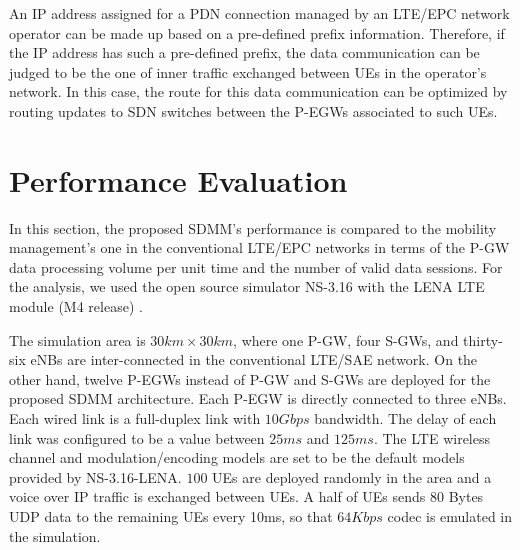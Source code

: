 \documentclass[runningheads,a4paper]{llncs}
\begin{document}
An IP address assigned for a PDN connection managed by an LTE/EPC network operator can be made up based on a pre-defined prefix information. Therefore, if the IP address has such a pre-defined prefix, the data communication can be judged to be the one of inner traffic exchanged between UEs in the operator's network. In this case, the route for this data communication can be optimized by routing updates to SDN switches between the P-EGWs associated to such UEs.


\section{Performance Evaluation}

In this section, the proposed SDMM's performance is compared to the mobility management's one in the conventional LTE/EPC networks in terms of the P-GW data processing volume per unit time and the number of valid data sessions. For the analysis, we used the open source simulator NS-3.16 with the LENA LTE module (M4 release) \cite{ref13-1}.

The simulation area is $30 km \times 30 km$, where one P-GW, four S-GWs, and thirty-six eNBs are inter-connected in the conventional LTE/SAE network. On the other hand, twelve P-EGWs instead of P-GW and S-GWs are deployed for the proposed SDMM architecture. Each P-EGW is directly connected to three eNBs. Each wired link is a full-duplex link with $10 Gbps$ bandwidth. The delay of each link was configured to be a value between $25 ms$ and $125 ms$. The LTE wireless channel and modulation/encoding models are set to be the default models provided by NS-3.16-LENA. $100$ UEs are deployed randomly in the area and a voice over IP traffic is exchanged between UEs. A half of UEs sends 80 Bytes UDP data to the remaining UEs every 10ms, so that $64 Kbps$ codec is emulated in the simulation.
\end{document}

